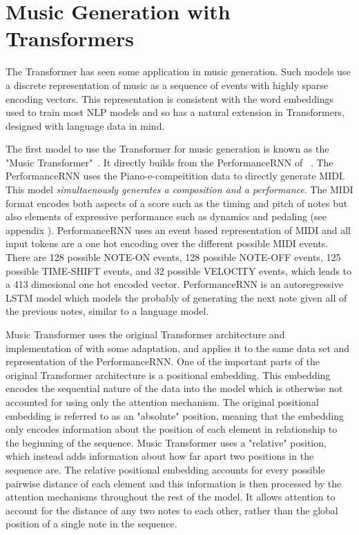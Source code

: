 \section{Music Generation with Transformers}
The Transformer has seen some application in music generation. Such models use a discrete representation of music as a sequence of events with highly sparse encoding vectors. This representation is consistent with the word embeddings used to train most NLP models and so has a natural extension in Transformers, designed with language data in mind. 

The first model to use the Transformer for music generation is known as the "Music Transformer"~\cite{huang2018music}. It directly builds from the PerformanceRNN of ~\citet{oore2020time}. The PerformanceRNN uses the Piano-e-compeitition data to directly generate MIDI. This model \emph{simultaenously generates a composition and a performance}. The MIDI format encodes both aspects of a score such as the timing and pitch of notes but also elements of expressive performance such as dynamics and pedaling (see appendix ). PerformanceRNN uses an event based representation of MIDI and all input tokens are a one hot encoding over the different possible MIDI events. There are 128 possible NOTE-ON events, 128 possible NOTE-OFF events, 125 possible TIME-SHIFT events, and 32 possible VELOCITY events, which leads to a 413 dimesional one hot encoded vector. PerformanceRNN is an autoregressive LSTM model which models the probably of generating the next note given all of the previous notes, similar to a language model. 

Music Transformer uses the original Transformer architecture and implementation of \citet{vaswani2017attention} with some adaptation, and applies it to the same data set and representation of the PerformanceRNN. One of the important parts of the original Transformer architecture is a positional embedding. This embedding encodes the sequential nature of the data into the model which is otherwise not accounted for using only the attention mechanism. The original positional embedding is referred to as an "absolute" position, meaning that the embedding only encodes information about the position of each element in relationship to the beginning of the sequence. Music Transformer uses a "relative" position, which instead adds information about how far apart two positions in the sequence are. The relative positional embedding accounts for every possible pairwise distance of each element and this information is then processed by the attention mechanisms throughout the rest of the model. It allows attention to account for the distance of any two notes to each other, rather than the global position of a single note in the sequence. 

